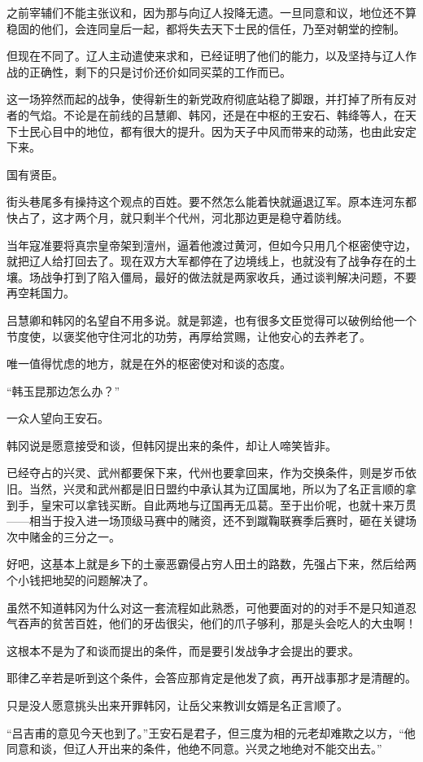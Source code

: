 之前宰辅们不能主张议和，因为那与向辽人投降无遗。一旦同意和议，地位还不算稳固的他们，会连同皇后一起，都将失去天下士民的信任，乃至对朝堂的控制。

但现在不同了。辽人主动遣使来求和，已经证明了他们的能力，以及坚持与辽人作战的正确性，剩下的只是讨价还价如同买菜的工作而已。

这一场猝然而起的战争，使得新生的新党政府彻底站稳了脚跟，并打掉了所有反对者的气焰。不论是在前线的吕慧卿、韩冈，还是在中枢的王安石、韩绛等人，在天下士民心目中的地位，都有很大的提升。因为天子中风而带来的动荡，也由此安定下来。

国有贤臣。

街头巷尾多有操持这个观点的百姓。要不然怎么能着快就逼退辽军。原本连河东都快占了，这才两个月，就只剩半个代州，河北那边更是稳守着防线。

当年寇准要将真宗皇帝架到澶州，逼着他渡过黄河，但如今只用几个枢密使守边，就把辽人给打回去了。现在双方大军都停在了边境线上，也就没有了战争存在的土壤。场战争打到了陷入僵局，最好的做法就是两家收兵，通过谈判解决问题，不要再空耗国力。

吕慧卿和韩冈的名望自不用多说。就是郭逵，也有很多文臣觉得可以破例给他一个节度使，以褒奖他守住河北的功劳，再厚给赏赐，让他安心的去养老了。

唯一值得忧虑的地方，就是在外的枢密使对和谈的态度。

“韩玉昆那边怎么办？”

一众人望向王安石。

韩冈说是愿意接受和谈，但韩冈提出来的条件，却让人啼笑皆非。

已经夺占的兴灵、武州都要保下来，代州也要拿回来，作为交换条件，则是岁币依旧。当然，兴灵和武州都是旧日盟约中承认其为辽国属地，所以为了名正言顺的拿到手，皇宋可以拿钱买断。自此两地与辽国再无瓜葛。至于出价呢，也就十来万贯——相当于投入进一场顶级马赛中的赌资，还不到蹴鞠联赛季后赛时，砸在关键场次中赌金的三分之一。

好吧，这基本上就是乡下的土豪恶霸侵占穷人田土的路数，先强占下来，然后给两个小钱把地契的问题解决了。

虽然不知道韩冈为什么对这一套流程如此熟悉，可他要面对的的对手不是只知道忍气吞声的贫苦百姓，他们的牙齿很尖，他们的爪子够利，那是头会吃人的大虫啊！

这根本不是为了和谈而提出的条件，而是要引发战争才会提出的要求。

耶律乙辛若是听到这个条件，会答应那肯定是他发了疯，再开战事那才是清醒的。

只是没人愿意挑头出来开罪韩冈，让岳父来教训女婿是名正言顺了。

“吕吉甫的意见今天也到了。”王安石是君子，但三度为相的元老却难欺之以方，“他同意和谈，但辽人开出来的条件，他绝不同意。兴灵之地绝对不能交出去。”

